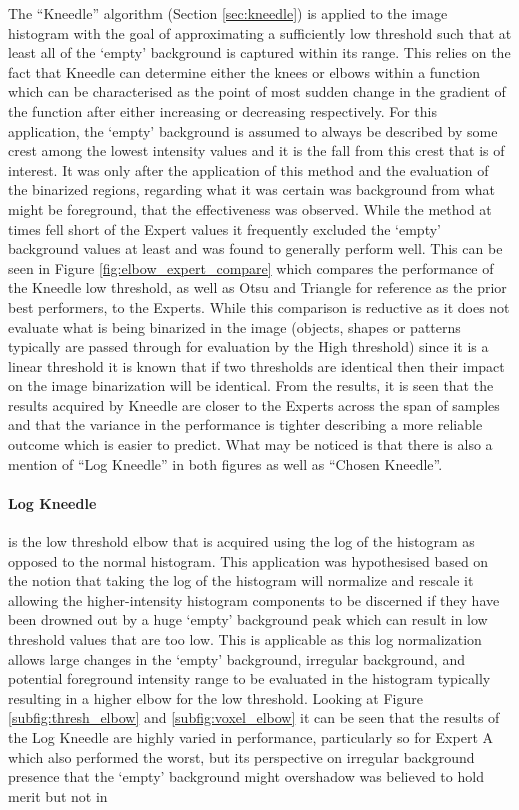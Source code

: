 The ``Kneedle'' algorithm (Section \ref{sec:kneedle}) is applied to the image histogram with the goal of approximating a sufficiently low threshold such that at least all of the `empty' background is captured within its range. This relies on the fact that Kneedle can determine either the knees or elbows within a function which can be characterised as the point of most sudden change in the gradient of the function after either increasing or decreasing respectively. For this application, the `empty' background is assumed to always be described by some crest among the lowest intensity values and it is the fall from this crest that is of interest. It was only after the application of this method and the evaluation of the binarized regions, regarding what it was certain was background from what might be foreground, that the effectiveness was observed. While the method at times fell short of the Expert values it frequently excluded the `empty' background values at least and was found to generally perform well. This can be seen in Figure \ref{fig:elbow_expert_compare} which compares the performance of the Kneedle low threshold, as well as Otsu and Triangle for reference as the prior best performers, to the Experts. While this comparison is reductive as it does not evaluate what is being binarized in the image (objects, shapes or patterns typically are passed through for evaluation by the High threshold) since it is a linear threshold it is known that if two thresholds are identical then their impact on the image binarization will be identical. From the results, it is seen that the results acquired by Kneedle are closer to the Experts across the span of samples and that the variance in the performance is tighter describing a more reliable outcome which is easier to predict. What may be noticed is that there is also a mention of ``Log Kneedle'' in both figures as well as ``Chosen Kneedle''.\paragraph{Log Kneedle} is the low threshold elbow that is acquired using the log of the histogram as opposed to the normal histogram. This application was hypothesised based on the notion that taking the log of the histogram will normalize and rescale it allowing the higher-intensity histogram components to be discerned if they have been drowned out by a huge `empty' background peak which can result in low threshold values that are too low. This is applicable as this log normalization allows large changes in the `empty' background, irregular background, and potential foreground intensity range to be evaluated in the histogram typically resulting in a higher elbow for the low threshold. Looking at Figure \ref{subfig:thresh_elbow} and \ref{subfig:voxel_elbow} it can be seen that the results of the Log Kneedle are highly varied in performance, particularly so for Expert A which also performed the worst, but its perspective on irregular background presence that the `empty' background might overshadow was believed to hold merit but not in 